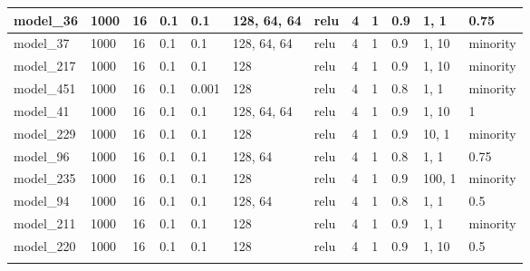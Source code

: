 \begin{tabular}{|l|l|l|l|l|l|l|l|l|l|l|l|}
model\_36      & 1000           & 16           & 0.1          & 0.1          & 128, 64, 64 & relu         & 4           & 1            & 0.9               & 1, 1             & 0.75                        \\ \hline
model\_37      & 1000           & 16           & 0.1          & 0.1          & 128, 64, 64 & relu         & 4           & 1            & 0.9               & 1, 10            & minority                    \\ \hline
model\_217     & 1000           & 16           & 0.1          & 0.1          & 128         & relu         & 4           & 1            & 0.9               & 1, 10            & minority                    \\ \hline
model\_451     & 1000           & 16           & 0.1          & 0.001        & 128         & relu         & 4           & 1            & 0.8               & 1, 1             & minority                    \\ \hline
model\_41      & 1000           & 16           & 0.1          & 0.1          & 128, 64, 64 & relu         & 4           & 1            & 0.9               & 1, 10            & 1                           \\ \hline
model\_229     & 1000           & 16           & 0.1          & 0.1          & 128         & relu         & 4           & 1            & 0.9               & 10, 1            & minority                    \\ \hline
model\_96      & 1000           & 16           & 0.1          & 0.1          & 128, 64     & relu         & 4           & 1            & 0.8               & 1, 1             & 0.75                        \\ \hline
model\_235     & 1000           & 16           & 0.1          & 0.1          & 128         & relu         & 4           & 1            & 0.9               & 100, 1           & minority                    \\ \hline
model\_94      & 1000           & 16           & 0.1          & 0.1          & 128, 64     & relu         & 4           & 1            & 0.8               & 1, 1             & 0.5                         \\ \hline
model\_211     & 1000           & 16           & 0.1          & 0.1          & 128         & relu         & 4           & 1            & 0.9               & 1, 1             & minority                    \\ \hline
model\_220     & 1000           & 16           & 0.1          & 0.1          & 128         & relu         & 4           & 1            & 0.9               & 1, 10            & 0.5                         \\ \hline
               &                &              &              &              &             &              &             &              &                   &                  &                             \\ \hline
\end{tabular}